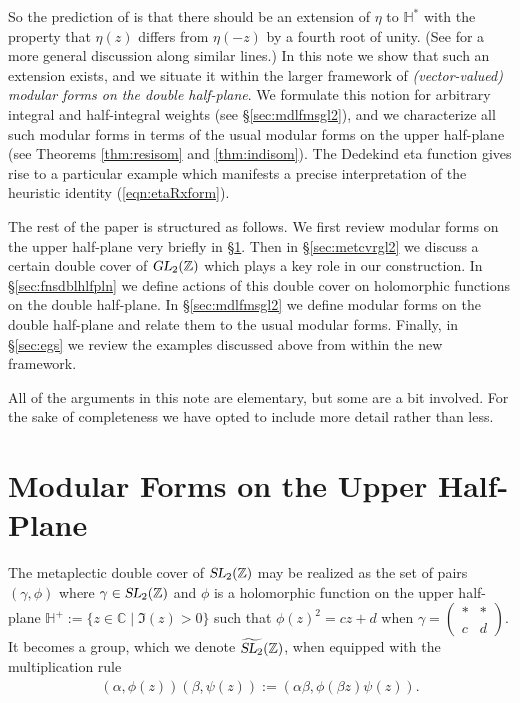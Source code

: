 \documentclass[aps,prd,groupedaddress,preprint,tightenlines,eqsecnum,nofootinbib]{revtex4}
\newcommand{\g}{\gamma}
\newcommand{\SL}{\operatorname{\textsl{SL}}}      %
\newcommand{\GL}{\operatorname{\textsl{GL}}}      %
\newcommand{\C}{{\mathbb C}}%
\newcommand{\Z}{{\mathbb Z}}%
\newcommand{\ZZ}{{\mathbb Z}}%
\newcommand{\HH}{{\mathbb H}}%
\newcommand{\A}{\alpha}
\newcommand{\B}{\beta}
\begin{document}
So the prediction of \cite{07T-rex1, 06T-rex2, 08T-rex0} is that there should be an extension of $\eta$ to $\HH^*$ with the property that $\eta(z)$ differs from $\eta(-z)$ by a fourth root of unity. (See \cite{09-Lfunctions} for a more general discussion along similar lines.) In this note we show that such an extension exists, and we situate it within the larger framework of {\em (vector-valued) modular forms on the double half-plane}. We formulate this notion for arbitrary integral and half-integral weights (see \S\ref{sec:mdlfmsgl2}), and we characterize all such modular forms in terms of the usual modular forms on the upper half-plane (see Theorems \ref{thm:resisom} and \ref{thm:indisom}). The Dedekind eta function gives rise to a particular example which manifests a precise interpretation of the heuristic identity (\ref{eqn:etaRxform}). 

The rest of the paper is structured as follows. We first review modular forms on the upper half-plane very briefly in \S\ref{sec:modfmssl2}. Then in \S\ref{sec:metcvrgl2} we discuss a certain double cover of $\GL_2(\ZZ)$ which plays a key role in our construction. In \S\ref{sec:fnsdblhlfpln} we define actions of this double cover on holomorphic functions on the double half-plane. In \S\ref{sec:mdlfmsgl2} we define modular forms on the double half-plane and relate them to the usual modular forms. Finally, in \S\ref{sec:egs} we review the examples discussed above from within the new framework.

All of the arguments in this note are elementary, but some are a bit involved. For the sake of completeness we have opted to include more detail rather than less.


\section{Modular Forms on the Upper Half-Plane}
\label{sec:modfmssl2}

The {metaplectic double cover} of $\SL_2(\Z)$ may be realized as the set of pairs $(\g,\phi)$ where $\g\in \SL_2(\Z)$ and $\phi$ is a holomorphic function on the upper half-plane $\HH^+ := \{ z \in \C \mid \Im(z) > 0\}$ such that $\phi(z)^2=cz+d$ when $\g=\left(\begin{smallmatrix}*&*\\c&d\end{smallmatrix}\right)$. It becomes a group, which we denote $\widetilde{\SL_2}(\Z)$, when equipped with the multiplication rule 
\begin{align}
\label{eqn:tildesl2mult}
(\A,\phi(z))(\B,\psi(z)):=(\A\B,\phi(\B z)\psi(z)).
\end{align} 
\end{document}
